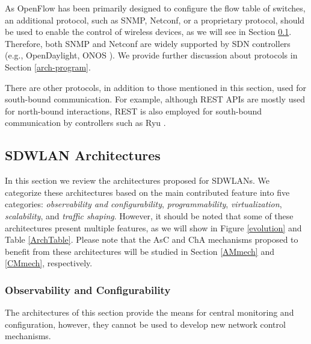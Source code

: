 As OpenFlow has been primarily designed to configure the flow table of switches, an additional protocol, such as SNMP, Netconf, or a proprietary protocol, should be used to enable the control of wireless devices, as we will see in Section \ref{Archs}.
Therefore, both SNMP and Netconf are widely supported by SDN controllers (e.g., OpenDaylight, ONOS \cite{berde2014onos}).
We provide further discussion about protocols in Section \ref{arch-program}.

There are other protocols, in addition to those mentioned in this section, used for south-bound communication.
For example, although REST APIs are mostly used for north-bound interactions, REST is also employed for south-bound communication by controllers such as Ryu \cite{ryu2015framework}.





\subsection{SDWLAN Architectures}
\label{Archs}
In this section we review the architectures proposed for SDWLANs.
We categorize these architectures based on the main contributed feature into five categories: \textit{observability and configurability}, \textit{programmability}, \textit{virtualization}, \textit{scalability}, and \textit{traffic shaping}. 
However, it should be noted that some of these architectures present multiple features, as we will show in Figure \ref{evolution} and Table \ref{ArchTable}.
Please note that the AsC and ChA mechanisms proposed to benefit from these architectures will be studied in Section \ref{AMmech} and \ref{CMmech}, respectively.



\subsubsection{\textbf{Observability and Configurability}}
The architectures of this section provide the means for central monitoring and configuration, however, they cannot be used to develop new network control mechanisms.


